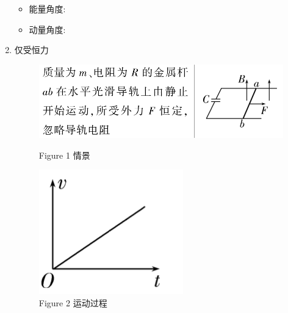 \documentclass{article}
\begin{document}
\begin{enumerate}[label = (\arabic*{})]
          \vspace{2em}

          \begin{itemize}
              \item 能量角度:
                    \vspace{5em}
              \item 动量角度:
                    \vspace{5em}
          \end{itemize}

          \vspace{2em}

    \item 仅受恒力

          \begin{figure}[H]
              \begin{minipage}{0.7\textwidth}
                  \centering
                  \includegraphics[width = \textwidth]{pictures/13.png}
                  \caption*{Figure 1 情景}
              \end{minipage}
              \hfill
              \begin{minipage}{0.25\textwidth}
                  \centering
                  \includegraphics[width = \textwidth]{pictures/14.png}
                  \caption*{Figure 2 运动过程}
              \end{minipage}
          \end{figure}


\end{enumerate}
\end{document}
